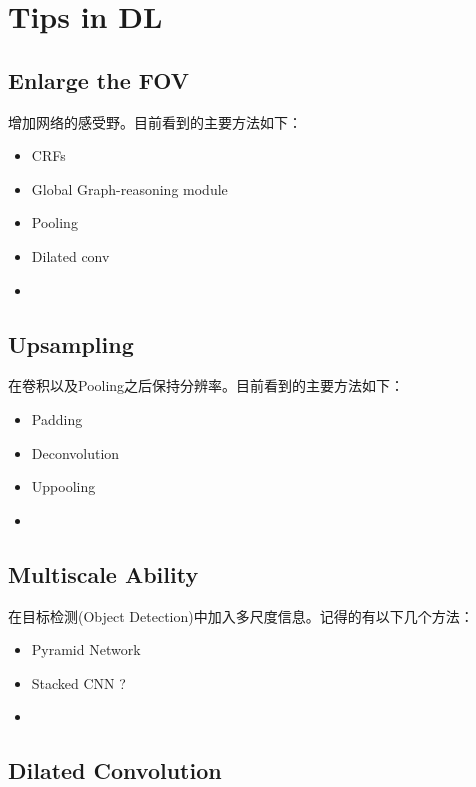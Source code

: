 \chapter{Tips in DL}

\section{Enlarge the FOV}

增加网络的感受野。目前看到的主要方法如下：

\begin{itemize}
\item CRFs\cite{marvin2018crf}
\item Global Graph-reasoning module\cite{chen18iterative}
\item Pooling
\item Dilated conv\cite{YuKoltun2016}
\item 
\end{itemize}


\section{Upsampling}

在卷积以及Pooling之后保持分辨率。目前看到的主要方法如下：

\begin{itemize}
\item Padding
\item Deconvolution
\item Uppooling
\item 
\end{itemize}


\section{Multiscale Ability}

在目标检测(Object Detection)中加入多尺度信息。记得的有以下几个方法：

\begin{itemize}
\item Pyramid Network
\item Stacked CNN ?
\item 
\end{itemize}


\section{Dilated Convolution}

